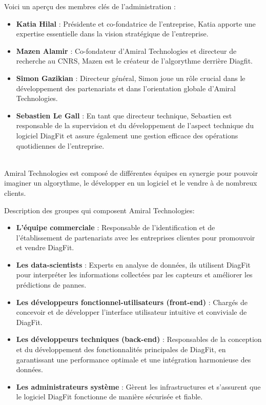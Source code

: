 Voici un aperçu des membres clés de l'administration :
\begin{itemize}
    \item \textbf{Katia Hilal} : Présidente et co-fondatrice de l'entreprise, Katia apporte une expertise essentielle dans la vision stratégique de l'entreprise.
    \item \textbf{Mazen Alamir} : Co-fondateur d'Amiral Technologies et directeur de recherche au CNRS, Mazen est le créateur de l'algorythme derrière Diagfit.
    \item \textbf{Simon Gazikian} : Directeur général, Simon joue un rôle crucial dans le développement des partenariats et dans l'orientation globale d'Amiral Technologies.
    \item \textbf{Sebastien Le Gall} : En tant que directeur technique, Sebastien est responsable de la supervision et du développement de l'aspect technique du logiciel DiagFit et assure également une gestion efficace des opérations quotidiennes de l'entreprise.
\end{itemize}\phantom{vide pour separer}\\

Amiral Technologies est composé de différentes équipes en synergie pour pouvoir imaginer un algorythme, le développer en un logiciel et le vendre à de nombreux clients.

Description des groupes qui composent Amiral Technologies:
\begin{itemize}
    \item \textbf{L'équipe commerciale} : Responsable de l'identification et de l'établissement de partenariats avec les entreprises clientes pour promouvoir et vendre DiagFit.
    \item \textbf{Les data-scientists} : Experts en analyse de données, ils utilisent DiagFit pour interpréter les informations collectées par les capteurs et améliorer les prédictions de pannes.
    \item \textbf{Les développeurs fonctionnel-utilisateurs (front-end)} : Chargés de concevoir et de développer l'interface utilisateur intuitive et conviviale de DiagFit.
    \item \textbf{Les développeurs techniques (back-end)} : Responsables de la conception et du développement des fonctionnalités principales de DiagFit, en garantissant une performance optimale et une intégration harmonieuse des données.
    \item \textbf{Les administrateurs système} : Gèrent les infrastructures et s'assurent que le logiciel DiagFit fonctionne de manière sécurisée et fiable.
\end{itemize}

